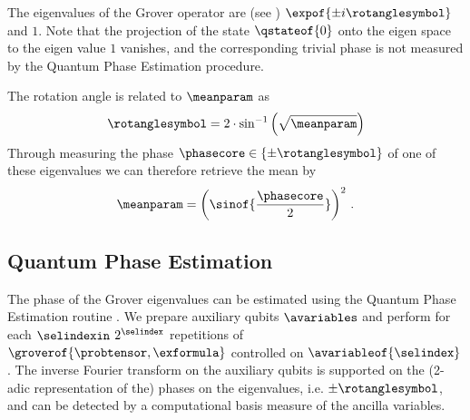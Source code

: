 
The eigenvalues of the Grover operator are (see ) $\expof{\pm i\rotanglesymbol}$ and $1$.
Note that the projection of the state $\qstateof{0}$ onto the eigen space to the eigen value $1$ vanishes, and the corresponding trivial phase is not measured by the Quantum Phase Estimation procedure.

The rotation angle is related to $\meanparam$ as
\begin{align*}
    \rotanglesymbol = 2 \cdot \sin^{-1}\left(\sqrt{\meanparam}\right)
\end{align*}
Through measuring the phase $\phasecore\in\{\pm\rotanglesymbol\}$ of one of these eigenvalues we can therefore retrieve the mean by
\begin{align*}
    \meanparam
    = \left(\sinof{\frac{\phasecore}{2}}\right)^2 \, .
\end{align*}

\subsection{Quantum Phase Estimation}

The phase of the Grover eigenvalues can be estimated using the Quantum Phase Estimation routine \cite{kitaev_quantum_1995, cleve_quantum_1998}.
We prepare auxiliary qubits $\avariables$ and perform for each $\selindexin$ $2^{\selindex}$ repetitions of $\groverof{\probtensor,\exformula}$ controlled on $\avariableof{\selindex}$.
The inverse Fourier transform on the auxiliary qubits is supported on the (2-adic representation of the) phases on the eigenvalues, i.e. $\pm\rotanglesymbol$, and can be detected by a computational basis measure of the ancilla variables.

